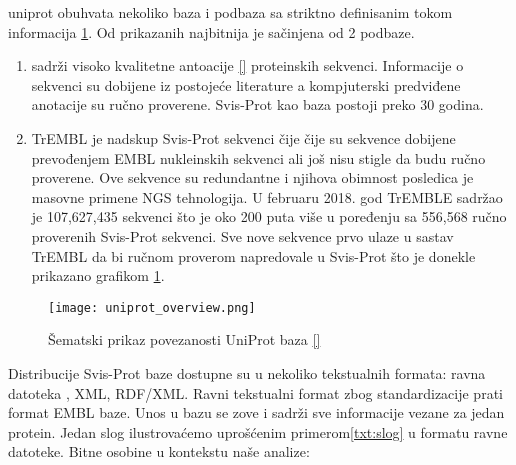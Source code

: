 uniprot obuhvata nekoliko baza i podbaza sa striktno definisanim tokom
informacija \ref{fig:uniprot_overview}. Od prikazanih najbitnija je
  sačinjena od 2 podbaze.


\begin{enumerate}
  \item {}  sadrži visoko kvalitetne antoacije
    \ref{} proteinskih sekvenci. Informacije o sekvenci su
    dobijene iz postojeće literature a kompjuterski predviđene anotacije su
    ručno proverene. Svis-Prot kao baza postoji preko 30 godina.

  \item TrEMBL  je nadskup Svis-Prot sekvenci čije čije su
    sekvence dobijene prevođenjem EMBL nukleinskih sekvenci ali još nisu stigle
    da budu ručno  proverene. Ove sekvence su redundantne i njihova obimnost
    posledica je masovne primene NGS tehnologija. U februaru 2018. god TrEMBLE
    sadržao je 107,627,435 sekvenci što je oko 200 puta više u poređenju sa
    556,568 ručno proverenih Svis-Prot sekvenci. Sve nove sekvence prvo ulaze u
    sastav TrEMBL da bi ručnom proverom napredovale u Svis-Prot što je donekle
    prikazano grafikom \ref{fig:uniprot_overview}.
\end{enumerate}


\begin{figure}[h!]
  \centering
  \texttt{[image: uniprot\_overview.png]}
  \caption{Šematski prikaz povezanosti UniProt baza \ref{}}
  \label{fig:uniprot_overview}
\end{figure}



Distribucije Svis-Prot baze dostupne su u nekoliko tekstualnih formata: ravna
datoteka , XML, RDF/XML.  Ravni tekstualni format zbog
standardizacije prati format EMBL baze.  Unos u bazu se zove 
 i sadrži sve informacije vezane za jedan protein. Jedan slog
ilustrovaćemo uprošćenim primerom\ref{txt:slog} u formatu ravne datoteke.
Bitne osobine u kontekstu naše analize:

